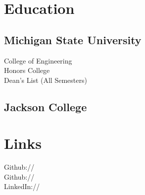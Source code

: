 \documentclass[]{deedy-resume-openfont}
\begin{document}
%
%

%
%



%
%

\begin{minipage}[t]{0.33\textwidth} 


\section{Education} 

\subsection{Michigan State University}
College of Engineering \\
Honors College \\
Dean's List (All Semesters) \\
\sectionsep

\subsection{Jackson College}
\sectionsep


\section{Links} 
Github:// \href{https://github.com/timjkelly}{} \\
Github:// \href{https://github.com/tjkkelly}{} \\
LinkedIn://  \href{https://www.linkedin.com/in/tjkkelly}{}
\sectionsep


\end{minipage}
\end{document}
